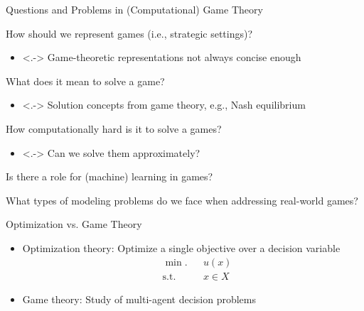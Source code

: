 \documentclass[11pt,aspectratio=169,handout]{beamer}
\begin{document}
  \begin{frame}{Questions and Problems in (Computational) Game Theory}
   \begin{itemizes}
    \item<+-> How should we represent games (i.e., strategic settings)?
    \begin{itemize}
     \item<.-> Game-theoretic representations not always concise enough
    \end{itemize} 
	\item<+-> What does it mean to solve a game?
	\begin{itemize}
	 \item<.-> Solution concepts from game theory, e.g., Nash equilibrium
	\end{itemize}
	\item<+-> How computationally hard is it to solve a games?
	\begin{itemize}
	 \item<.-> Can we solve them approximately?
	\end{itemize}
	\item<+-> Is there a role for (machine) learning in games?
    \item<+-> What types of modeling problems do we face when addressing real-world games?
   \end{itemizes}
  \end{frame}
  
  
  
  \begin{frame}{Optimization vs. Game Theory}
   \begin{itemize}[<+->]
    \item {\color{blue}Optimization theory}: Optimize a single objective over a decision variable
    \begin{equation*}
     \begin{aligned}
      &\min.			& 	&u(x)\\
      &\text{s.t.}		&	&x \in X
     \end{aligned}
    \end{equation*}
    \item {\color{blue}Game theory}: Study of multi-agent decision problems
   \end{itemize}    
  \end{frame}
  
\end{document}
